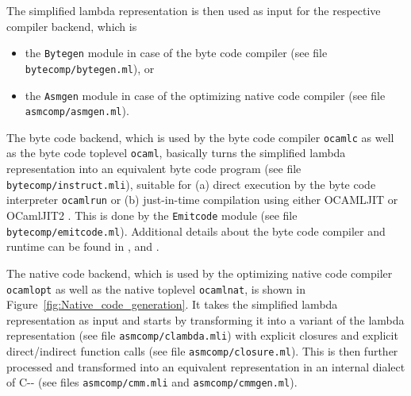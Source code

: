 \documentclass[10pt,a4paper,draft,twocolumn]{article}
\begin{document}
The simplified lambda representation is then used as input for the respective compiler
backend, which is
\begin{itemize}
\item the \texttt{Bytegen} module in case of the byte code compiler
  (see file \texttt{bytecomp/bytegen.ml}), or
\item the \texttt{Asmgen} module in case of the optimizing native code compiler
  (see file \texttt{asmcomp/asmgen.ml}).
\end{itemize}

The byte code backend, which is used by the byte code compiler \texttt{ocamlc} as well as
the byte code toplevel \texttt{ocaml}, basically turns the simplified lambda representation
into an equivalent byte code program (see file \texttt{bytecomp/instruct.mli}), suitable for
(a) direct execution by the byte code interpreter \texttt{ocamlrun} or (b) just-in-time
compilation using either OCAMLJIT \cite{Starynkevitch04} or OCamlJIT2
\cite{Meurer10jit,Meurer10ocamljit,Meurer11ocamljit2}.
This is done by the \texttt{Emitcode} module (see file \texttt{bytecomp/emitcode.ml}).
Additional details about the byte code compiler and runtime can be found in \cite{Leroy90},
\cite{Meurer10ocamljit} and \cite{Starynkevitch04}.

The native code backend, which is used by the optimizing native code compiler \texttt{ocamlopt}
as well as the native toplevel \texttt{ocamlnat}, is shown in Figure~\ref{fig:Native_code_generation}.
It takes the simplified lambda representation as input and starts by transforming it into a variant
of the lambda representation (see file \texttt{asmcomp/clambda.mli}) with explicit closures and
explicit direct/indirect function calls (see file \texttt{asmcomp/closure.ml}). This is then further
processed and transformed into an equivalent representation in an internal dialect of C\mbox{-}\mbox{-}
\cite{JonesR98,JonesRR99} (see files \texttt{asmcomp/cmm.mli} and \texttt{asmcomp/cmmgen.ml}).
\end{document}
